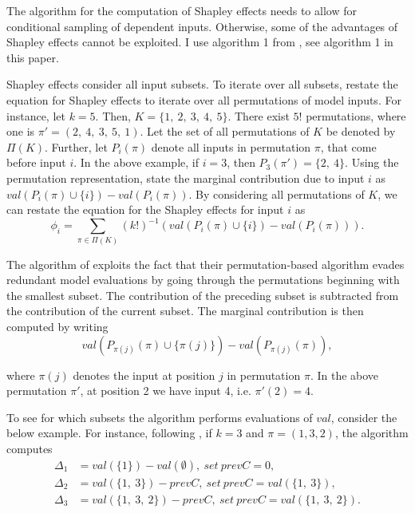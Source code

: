 The algorithm for the computation of Shapley effects needs to allow for conditional sampling of dependent inputs. Otherwise, some of the advantages of Shapley effects cannot be exploited. I use algorithm 1 from \citet{SNS16}, see algorithm 1 in this paper.

Shapley effects consider all input subsets. To iterate over all subsets, \citet{SNS16} restate the equation for Shapley effects to iterate over all permutations of model inputs. For instance, let $k=5$. Then, $K=\{1,\ 2,\ 3,\ 4,\ 5\}$. There exist $5!$ permutations, where one is $\pi'=(2,\ 4,\ 3,\ 5,\ 1)$. Let the set of all permutations of $K$ be denoted by $\Pi(K)$. Further, let $P_i(\pi)$ denote all inputs in permutation $\pi$, that come before input $i$. In the above example, if $i=3$, then $P_3(\pi')=\{2,\ 4\}$. Using the permutation representation, \citet{SNS16} state the marginal contribution due to input $i$ as $val(P_i(\pi) \cup\{i\}) - val(P_i(\pi))$. By considering all permutations of $K$, we can restate the equation for the Shapley effects for input $i$ as
\begin{equation}
\phi_i=\sum_{\pi \in \Pi(K)} (k!)^{-1} (val(P_i(\pi) \cup\{i\}) - val(P_i(\pi))).
\end{equation}

The algorithm of \citet{SNS16} exploits the fact that their permutation-based algorithm evades redundant model evaluations by going through the permutations beginning with the smallest subset. The contribution of the preceding subset is subtracted from the contribution of the current subset. The marginal contribution is then computed by writing
\begin{equation}
val(P_{\pi(j)}(\pi) \cup \{\pi(j)\}) - val(P_{\pi(j)}(\pi)),
\end{equation}

\noindent where $\pi(j)$ denotes the input at position $j$ in permutation $\pi$. In the above permutation $\pi'$, at position 2 we have input 4, i.e. $\pi'(2)=4$.

To see for which subsets the algorithm performs evaluations of $val$, consider the below example. For instance, following \citet{SNS16}, if $k=3$ and $\pi=(1, 3, 2)$, the algorithm computes
\begin{align*}
\Delta_1 &=val(\{1\})-val(\emptyset),\ set\ prevC=0, \\
\Delta_2 &=val(\{1,\ 3\})-prevC,\ set\ prevC=val(\{1,\ 3\}), \\
\Delta_3 &=val(\{1,\ 3,\ 2\})-prevC,\ set\ prevC=val(\{1,\ 3,\ 2\}).
\end{align*}

